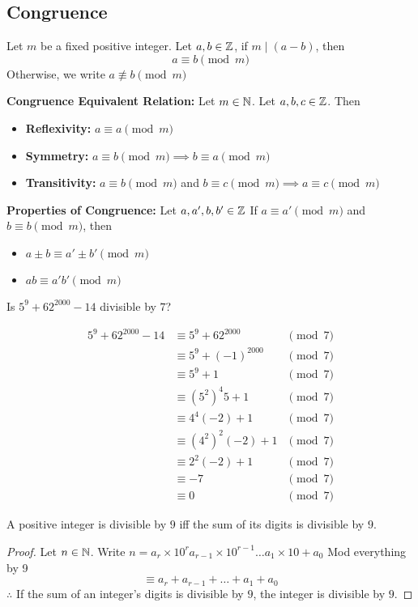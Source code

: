 \documentclass[english, 12pt]{article}
\begin{document}
\subsection{Congruence}
\begin{defn}
Let $m$ be a fixed positive integer. Let $a,b \in {\mathbb{Z}}$, if $m \mid (a-b)$, then
\[a \equiv b \pmod m \]
Otherwise, we write $a \not\equiv b \pmod m$
\end{defn}
\begin{thrm}[CER]
\textbf{Congruence Equivalent Relation:} Let $m \in {\mathbb{N}}$. Let $a,b,c \in {\mathbb{Z}}$. Then
\begin{itemize}
\item \textbf{Reflexivity:} $a \equiv a \pmod m$
\item \textbf{Symmetry:} $a \equiv b \pmod m \implies b \equiv a \pmod m$
\item \textbf{Transitivity:} $a \equiv b \pmod m$ and $b \equiv c \pmod m \implies a \equiv c \pmod m$
\end{itemize}
\end{thrm}
\begin{thrm}[PC]
\textbf{Properties of Congruence:} Let $a,a',b,b' \in {\mathbb{Z}}$ If $a \equiv a' \pmod m$ and $ b \equiv b \pmod m$, then
\begin{itemize}
\item $a \pm b \equiv a' \pm b' \pmod m$
\item $ab \equiv a' b' \pmod m$
\end{itemize}
\end{thrm}
\begin{exmp}
Is $5^9 + 62^{2000}-14$ divisible by $7$?
\begin{sol}
\begin{align*}
5^9 + 62^{2000}-14 & \equiv 5^9 + 62^{2000} &\pmod 7\\
& \equiv 5^9 + (-1)^{2000} &\pmod 7\\
& \equiv 5^9 + 1 &\pmod 7\\
& \equiv (5^2)^4 5 + 1 &\pmod 7\\
& \equiv 4^4(-2) + 1 &\pmod 7\\
& \equiv (4^2)^2 (-2) + 1 &\pmod 7\\
& \equiv 2^2(-2) +1 &\pmod 7\\
& \equiv -7 &\pmod 7\\
&\equiv 0 &\pmod 7
\end{align*}
\end{sol}
\end{exmp}
\begin{exmp}
A positive integer is divisible by $9$ iff the sum of its digits is divisible by $9$.
\begin{proof}
Let $n \in {\mathbb{N}}$. Write $n = a_{r}\times10^r a_{r-1}\times10^{r-1} \dots a_{1}\times 10 + a_{0}$
Mod everything by 9
\[\equiv a_{r}+  a_{r-1} + \dots+  a_{1}+ a_{0}\]
$\therefore$ If the sum of an integer's digits is divisible by $9$, the integer is divisible by $9$.
\end{proof}
\end{exmp}
\end{document}
